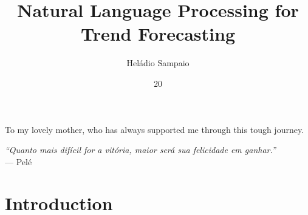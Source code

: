 \documentclass[tg, eng]{ita}    %
\author{Heládio Sampaio}{Lopes}
\title{Natural Language Processing for Trend Forecasting}
\date{20}{November}{2020}
\begin{document}
	
\maketitle

\begin{itadedication}
To my lovely mother, who has always supported me through this tough journey.
\end{itadedication}

\begin{itathanks}

\end{itathanks}

\thispagestyle{empty}
\ifhyperref{}\fi
\begin{flushright}
\begin{spacing}{1}
\mbox{}\vfill
{\sffamily\itshape
``Quanto mais difícil for a vitória, maior será sua felicidade em ganhar.''\\}
--- Pel\'e \textsc{}
\end{spacing}
\end{flushright}

\begin{abstract}
\noindent

\end{abstract}

\begin{englishabstract}
\noindent

\end{englishabstract}

\listoffigures %

\listoftables %

\listofabbreviations


\tableofcontents

\mainmatter

\chapter{Introduction}\label{chap:intro}

\end{document}
